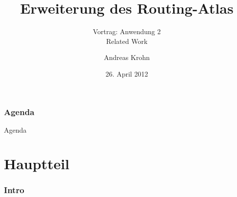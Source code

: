 \documentclass[ngerman,compress,hyperref={bookmarks}]{beamer}
\title{Erweiterung des Routing-Atlas}
\subtitle{Vortrag: Anwendung 2\\ Related Work}
\author{Andreas Krohn}
\institute[HAW]{Hochschule für Angewandte Wissenschaften Hamburg}
\date[SoSe 2012]{26. April 2012}
\begin{document}
\frame[plain]{\titlepage}

\section*{Agenda}
\begin{frame}{Agenda} \setcounter{tocdepth}{1} \tableofcontents[part=1] \setcounter{tocdepth}{3} \end{frame}

\part{Hauptteil}
\section{Intro}
\end{document}
